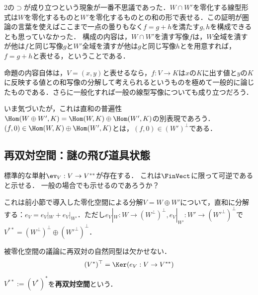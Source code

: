 \documentclass[uplatex, dvipdfmx]{jsreport}
\begin{document}
\begin{remarks}[2の構成に仰天]
    2の$\supset$が成り立つという現象が一番不思議であった．$W\cap W'$を零化する線型形式は$W$を零化するものと$W'$を零化するものとの和の形で表せる．この証明が圏論の言葉を使えばここまで一点の曇りもなく$f=g+h$を満たす$g,h$を構成できるとも思っていなかった．
    構成の内容は，$W\cap W'$を潰す写像$f$は，$W$全域を潰すが他は$f$と同じ写像$g$と$W'$全域を潰すが他は$g$と同じ写像$h$とを用意すれば，$f=g+h$と表せる，ということである．

    命題の内容自体は，$V=(x,y)$と表せるなら，$f:V\to K$は$x$の$K$に出す値と$y$の$K$に反映する値との和写像の分解して考えられるというものを極めて一般的に論じたものである．さらに一般化すれば一般の線型写像についても成り立つだろう．
    
    いま気づいたが，これは直和の普遍性$\Hom(W\oplus W',K)=\Hom(W,K)\oplus\Hom(W',K)$の別表現であろう．$(f,0)\in \Hom(W,K)\oplus\Hom(W',K)$とは，$(f,0)\in (W')^\bot$である．
\end{remarks}

\subsection{再双対空間：謎の飛び道具状態}

\begin{tcolorbox}[colframe=ForestGreen, colback=ForestGreen!10!white, breakable]
    標準的な単射$\ev_V:V\to V^{**}$が存在する．
    これは$\FinVect$に限って可逆であると示せる．
    一般の場合でも示せるのであろうか？

    これは前小節で導入した零化空間による分解$V=W\oplus W'$について，直和に分解する：$e_V=e_V|_W+e_V|_{W'}$．ただし$e_V|_W:W\to(W^\bot)^\bot,e_V|_{W'}:W'\to(W'^\bot)^\bot$で
    $V^{**}=(W^\bot)^\bot\oplus(W'^\bot)^\bot$．

    被零化空間の議論に再双対の自然同型は欠かせない．
    \[(V^*)^\top=\Ker (e_V:V\to V^{**})\]
\end{tcolorbox}

\begin{definition}
    $V^{**}:=(V^*)^*$を\textbf{再双対空間}という．
\end{definition}
\end{document}
